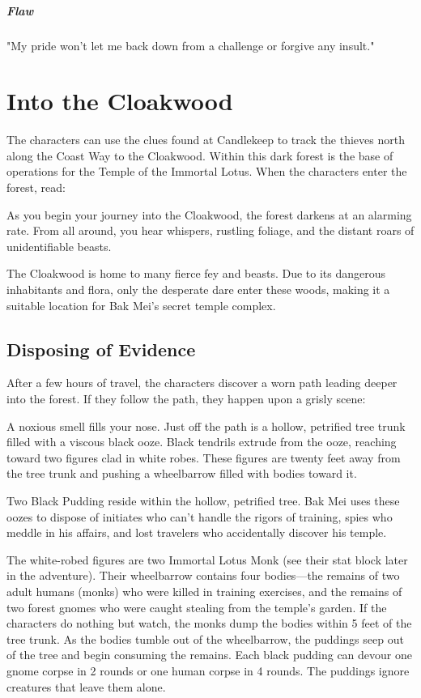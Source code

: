 \documentclass[10pt,a4paper,twoside,bg=print,twocolumn,openany,nodeprecatedcode]{dndbook}
\begin{document}
\subparagraph{Flaw}
"My pride won't let me back down from a challenge or forgive any insult."

\section{Into the Cloakwood}
The characters can use the clues found at Candlekeep to track the thieves north along the Coast Way to the Cloakwood. Within this dark forest is the base of operations for the Temple of the Immortal Lotus. When the characters enter the forest, read:

\begin{DndReadAloud}{}
As you begin your journey into the Cloakwood, the forest darkens at an alarming rate. From all around, you hear whispers, rustling foliage, and the distant roars of unidentifiable beasts.

\end{DndReadAloud}

The Cloakwood is home to many fierce fey and beasts. Due to its dangerous inhabitants and flora, only the desperate dare enter these woods, making it a suitable location for Bak Mei's secret temple complex.

\subsection{Disposing of Evidence}
After a few hours of travel, the characters discover a worn path leading deeper into the forest. If they follow the path, they happen upon a grisly scene:

\begin{DndReadAloud}{}
A noxious smell fills your nose. Just off the path is a hollow, petrified tree trunk filled with a viscous black ooze. Black tendrils extrude from the ooze, reaching toward two figures clad in white robes. These figures are twenty feet away from the tree trunk and pushing a wheelbarrow filled with bodies toward it.

\end{DndReadAloud}

Two Black Pudding reside within the hollow, petrified tree. Bak Mei uses these oozes to dispose of initiates who can't handle the rigors of training, spies who meddle in his affairs, and lost travelers who accidentally discover his temple.

The white-robed figures are two Immortal Lotus Monk (see their stat block later in the adventure). Their wheelbarrow contains four bodies—the remains of two adult humans (monks) who were killed in training exercises, and the remains of two forest gnomes who were caught stealing from the temple's garden. If the characters do nothing but watch, the monks dump the bodies within 5 feet of the tree trunk. As the bodies tumble out of the wheelbarrow, the puddings seep out of the tree and begin consuming the remains. Each black pudding can devour one gnome corpse in 2 rounds or one human corpse in 4 rounds. The puddings ignore creatures that leave them alone.
\end{document}
